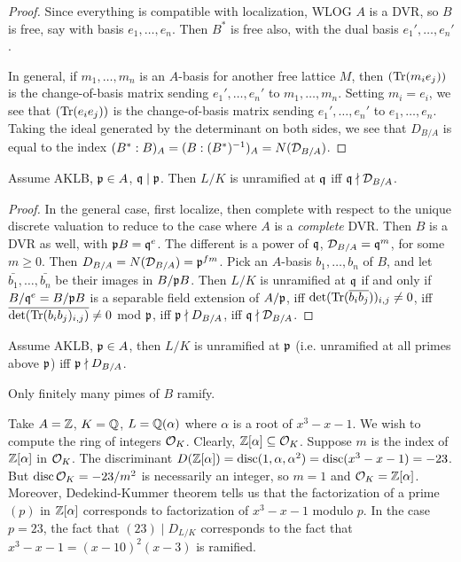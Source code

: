 \documentclass[11pt]{amsart}
\begin{document}
\begin{proof}
Since everything is compatible with localization, WLOG $A$ is a DVR, so $B$ is free, say with basis $e_1,\dots,e_n$. Then $B^*$ is free also, with the dual basis $e_1',\dots,e_n'$. 

In general, if $m_1,\dots,m_n$ is an $A$-basis for another free lattice $M$, then $(\operatorname{Tr}(m_ie_j))$ is the change-of-basis matrix sending $e_1',\dots,e_n'$ to $m_1,\dots,m_n$. Setting $m_i = e_i$, we see that $(\operatorname{Tr}(e_ie_j))$ is the change-of-basis matrix sending $e_1',\dots,e_n'$ to $e_1,\dots,e_n$. Taking the ideal generated by the determinant on both sides, we see that $D_{B/A}$ is equal to the index $(B^*: B)_A = (B: (B^*)^{-1})_A = N(\mathcal{D}_{B/A})$.
\end{proof}


\begin{thm}
Assume AKLB, $\mathfrak{p}\in A$, $\mathfrak{q}\mid \mathfrak{p}$. Then $L/K$ is unramified at $\mathfrak{q}$ iff $\mathfrak{q}\nmid \mathcal{D}_{B/A}$.
\end{thm}

\begin{proof}
In the general case, first localize, then complete with respect to the unique discrete valuation to reduce to the case where $A$ is a \emph{complete} DVR. Then $B$ is a DVR as well, with $\mathfrak{p} B = \mathfrak{q}^e$. The different is a power of $\mathfrak{q}$, $\mathcal{D}_{B/A} = \mathfrak{q}^m$, for some $m\ge 0$. Then $D_{B/A} = N(\mathcal{D}_{B/A}) = \mathfrak{p}^{fm}$. Pick an $A$-basis $b_1,\dots,b_n$ of $B$, and let $\bar{b_1},\dots,\bar{b_n}$ be their images in $B/\mathfrak{p} B$. Then $L/K$ is unramified at $\mathfrak{q}$ if and only if $B/\mathfrak{q}^e = B/\mathfrak{p} B$ is a separable field extension of $A/\mathfrak{p}$, iff $\det(\operatorname{Tr}(\overline{b_i}\overline{b_j}))_{i,j}\neq 0$, iff $\overline{\det(\operatorname{Tr}(b_ib_j)_{i,j})} \neq 0$ mod $\mathfrak{p}$, iff $\mathfrak{p}\nmid D_{B/A}$, iff $\mathfrak{q}\nmid \mathcal{D}_{B/A}$.
\end{proof}

\begin{cor}
Assume AKLB, $\mathfrak{p}\in A$, then $L/K$ is unramified at $\mathfrak{p}$ (i.e. unramified at all primes above $\mathfrak{p}$) iff $\mathfrak{p}\nmid D_{B/A}$.
\end{cor}

\begin{cor}
Only finitely many pimes of $B$ ramify.
\end{cor}

\begin{exm}
Take $A=\mathbb{Z}$, $K=\mathbb{Q}$, $L=\mathbb{Q}(\alpha)$ where $\alpha$ is a root of $x^3-x-1$. We wish to compute the ring of integers $\mathcal{O}_K$. Clearly, $\mathbb{Z}[\alpha]\subseteq \mathcal{O}_K$. Suppose $m$ is the index of $\mathbb{Z}[\alpha]$ in $\mathcal{O}_K$. The discriminant $D(\mathbb{Z}[\alpha]) = \operatorname{disc}(1,\alpha,\alpha^2) = \operatorname{disc}(x^3-x-1) = -23$. But $\operatorname{disc} \mathcal{O}_K = -23/m^2$ is necessarily an integer, so $m=1$ and $\mathcal{O}_K = \mathbb{Z}[\alpha]$. Moreover, Dedekind-Kummer theorem tells us that the factorization of a prime $(p)$ in $\mathbb{Z}[\alpha]$ corresponds to factorization of $x^3-x-1$ modulo $p$. In the case $p=23$, the fact that $(23)\mid D_{L/K}$ corresponds to the fact that $x^3-x-1 = (x-10)^2(x-3)$ is ramified.
\end{exm}
\end{document}
